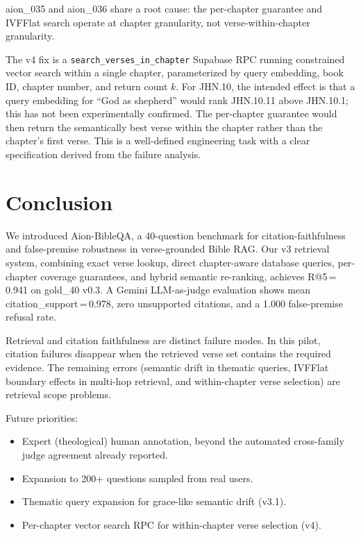\documentclass[11pt]{article}
\begin{document}
aion\_035 and aion\_036 share a root cause: the per-chapter guarantee and IVFFlat search operate at chapter granularity, not verse-within-chapter granularity.

The v4 fix is a \texttt{search\_verses\_in\_chapter} Supabase RPC running constrained vector search within a single chapter, parameterized by query embedding, book ID, chapter number, and return count $k$.
For JHN.10, the intended effect is that a query embedding for ``God as shepherd'' would rank JHN.10.11 above JHN.10.1; this has not been experimentally confirmed.
The per-chapter guarantee would then return the semantically best verse within the chapter rather than the chapter's first verse.
This is a well-defined engineering task with a clear specification derived from the failure analysis.

\section{Conclusion}

We introduced Aion-BibleQA, a 40-question benchmark for citation-faithfulness and false-premise robustness in verse-grounded Bible RAG.
Our v3 retrieval system, combining exact verse lookup, direct chapter-aware database queries, per-chapter coverage guarantees, and hybrid semantic re-ranking, achieves R@5\,=\,0.941 on gold\_40 v0.3.
A Gemini LLM-as-judge evaluation shows mean citation\_support\,=\,0.978, zero unsupported citations, and a 1.000 false-premise refusal rate.

Retrieval and citation faithfulness are distinct failure modes.
In this pilot, citation failures disappear when the retrieved verse set contains the required evidence.
The remaining errors (semantic drift in thematic queries, IVFFlat boundary effects in multi-hop retrieval, and within-chapter verse selection) are retrieval scope problems.

Future priorities:
\begin{itemize}
  \item Expert (theological) human annotation, beyond the automated cross-family judge agreement already reported.
  \item Expansion to 200+ questions sampled from real users.
  \item Thematic query expansion for grace-like semantic drift (v3.1).
  \item Per-chapter vector search RPC for within-chapter verse selection (v4).
\end{itemize}
\end{document}
